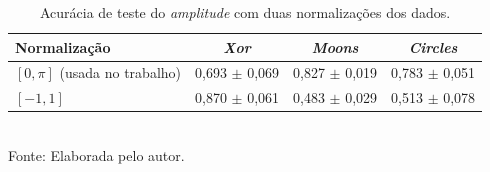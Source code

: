 \begin{table}[htb]
\centering
\caption[Normalização dos dados no \textit{amplitude}]{Acurácia de teste do \textit{amplitude} com duas normalizações dos dados.}
\label{tab:diagnostico}
\begin{tabular}{lccc}
\toprule
Normalização & \textit{Xor} & \textit{Moons} & \textit{Circles} \\
\midrule
$[0, \pi]$ (usada no trabalho) & 0,693 $\pm$ 0,069 & 0,827 $\pm$ 0,019 & 0,783 $\pm$ 0,051 \\
$[-1, 1]$ & 0,870 $\pm$ 0,061 & 0,483 $\pm$ 0,029 & 0,513 $\pm$ 0,078 \\
\bottomrule
\end{tabular}
\\[2pt]
{\footnotesize Fonte: Elaborada pelo autor.}
\end{table}
